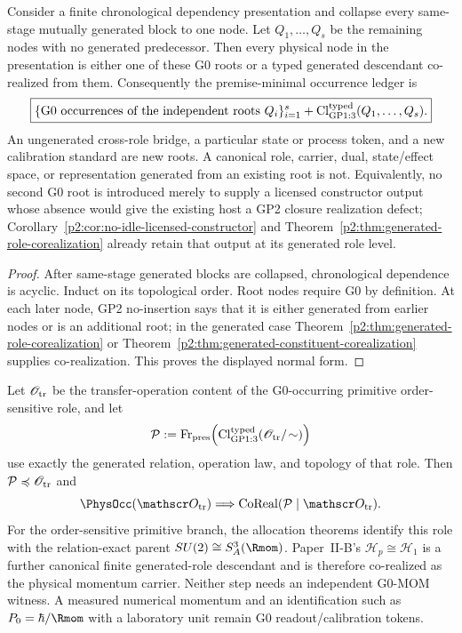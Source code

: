 \documentclass[12pt,a4paper]{article}
\begin{document}
\begin{corollary}
\label{p2:cor:root-descendant-occurrence-normal-form}
Consider a finite chronological dependency presentation and collapse every
same-stage mutually generated block to one node.  Let
\(Q_1,\ldots,Q_s\) be the remaining nodes with no generated predecessor.
Then every physical node in the presentation is either one of these G0 roots
or a typed generated descendant co-realized from them.  Consequently the
premise-minimal occurrence ledger is
\[
 \boxed{
   \{\text{G0 occurrences of the independent roots }Q_i\}_{i=1}^{s}
   +\operatorname{Cl}_{\rm GP1:3}^{\rm typed}(Q_1,\ldots,Q_s).}
\]
An ungenerated cross-role bridge, a particular state or process token, and a
new calibration standard are new roots.  A canonical role, carrier, dual,
state/effect space, or representation generated from an existing root is not.
Equivalently, no second G0 root is introduced merely to supply a licensed
constructor output whose absence would give the existing host a GP2 closure
realization defect; Corollary~\ref{p2:cor:no-idle-licensed-constructor} and
Theorem~\ref{p2:thm:generated-role-corealization} already retain that output at
its generated role level.
\end{corollary}

\begin{proof}
After same-stage generated blocks are collapsed, chronological dependence is
acyclic.  Induct on its topological order.  Root nodes require G0 by
definition.  At each later node, GP2 no-insertion says that it is either
generated from earlier nodes or is an additional root; in the generated case
Theorem~\ref{p2:thm:generated-role-corealization} or
Theorem~\ref{p2:thm:generated-constituent-corealization} supplies
co-realization.  This proves the displayed normal form.
\end{proof}

\begin{corollary}
\label{p2:cor:operational-momentum-role-occurrence}
Let \(\mathscr O_{\rm tr}\) be the transfer-operation content of the
G0-occurring primitive order-sensitive role, and let
\[
 \mathcal P
 :=\operatorname{Fr}_{\rm pres}\!\left(
   \operatorname{Cl}^{\rm typed}_{\rm GP1:3}
   (\mathscr O_{\rm tr}/\!\sim)\right)
\]
use exactly the generated relation, operation law, and topology of that role.
Then \(\mathcal P\preccurlyeq\mathscr O_{\rm tr}\) and
\[
 \PhysOcc(\mathscr O_{\rm tr})
 \Longrightarrow
 \operatorname{CoReal}(\mathcal P\mid\mathscr O_{\rm tr}).
\]
For the order-sensitive primitive branch, the allocation theorems identify
this role with the relation-exact parent
\(SU(2)\cong S^3_A(\Rmom)\).  Paper~II-B's
\(\mathcal H_p\cong\mathcal H_1\) is a further canonical finite generated-role
descendant and is therefore co-realized as the physical momentum carrier.
Neither step needs an independent G0-MOM witness.  A measured numerical
momentum and an identification such as
\(P_0=\hbar/\Rmom\) with a laboratory unit remain G0 readout/calibration
tokens.
\end{corollary}
\end{document}
